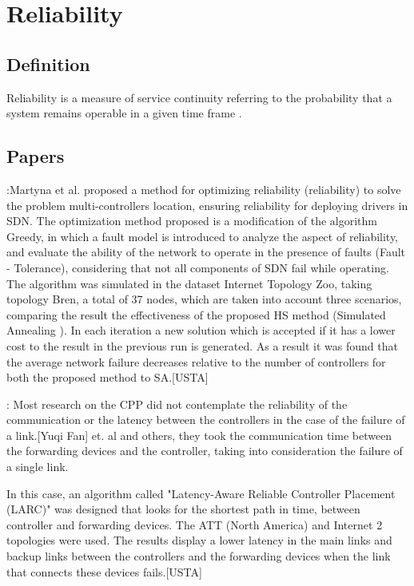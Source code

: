 \documentclass[a4paper,10pt]{article}
\begin{document}
\section{Reliability}
\subsection{Definition}
Reliability is a measure of service continuity referring to the probability that a system remains operable in a given time frame \cite{Rak15}. 



\subsection{Papers}
\cite{MaJe18}:Martyna et al. proposed a method for optimizing reliability (reliability) to solve the problem multi-controllers location, ensuring reliability for deploying drivers in SDN. The optimization method proposed is a modification of the algorithm Greedy, in which a fault model is introduced to analyze the aspect of reliability, and evaluate the ability of the network to operate in the presence of faults (Fault - Tolerance), considering that not all components of SDN fail while operating. The algorithm was simulated in the dataset Internet Topology Zoo, taking topology Bren, a total of 37 nodes, which are taken into account three scenarios, comparing the result the effectiveness of the proposed HS method (Simulated Annealing ). In each iteration a new solution which is accepted if it has a lower cost to the result in the previous run is generated. As a result it was found that the average network failure decreases relative to the number of controllers for both the proposed method to SA.[USTA]

\cite{FaXi18}: Most research on the CPP did not contemplate the reliability of the communication or the latency between the controllers in the case of the failure of a link.[Yuqi Fan] et. al and others, they took the communication time between the forwarding devices and the controller, taking into consideration the failure of a single link.


In this case, an algorithm called "Latency-Aware Reliable Controller Placement (LARC)" was designed that looks for the shortest path in time, between controller and forwarding devices. The ATT (North America) and Internet 2 topologies were used.
The results display a lower latency in the main links and backup links between the controllers and the forwarding devices when the link that connects these devices fails.[USTA]
\end{document}
